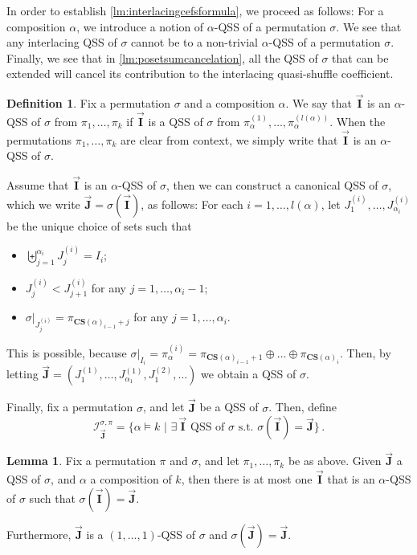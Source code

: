\documentclass[12pt, reqno]{amsart}
\theoremstyle{definition}
\newtheorem{lm}[thm]{Lemma}
\newtheorem{defin}[thm]{Definition}
\newcommand{\III}{\vec{\mathbf{I}}}
\newcommand{\JJJ}{\vec{\mathbf{J}}}
\begin{document}
In order to establish \cref{lm:interlacingcefsformula}, we proceed as follows:
For a composition $\alpha$, we introduce a notion of $\alpha$-QSS of a permutation $\sigma$.
We see that any interlacing QSS of $\sigma$ cannot be  to a non-trivial $\alpha$-QSS of a permutation $\sigma$.
Finally, we see that in \cref{lm:posetsumcancelation}, all the QSS of $\sigma$ that can be extended will cancel its contribution to the interlacing quasi-shuffle coefficient.

\begin{defin}
Fix a permutation $\sigma $ and a composition $\alpha $.
We say that $\III$ is an $\alpha$-QSS of $\sigma$ from $\pi_1, \dots ,\pi_k$ if $\III $ is a QSS of $\sigma $ from $\pi^{(1)}_{\alpha }, \dots ,\pi^{(l(\alpha ))}_{\alpha } $.
When the permutations $\pi_1, \dots ,\pi_k$ are clear from context, we simply write that $\III $ is an $\alpha$-QSS of $\sigma$.

Assume that $\III$ is an $\alpha$-QSS of $\sigma$, then we can construct a canonical QSS of $\sigma $, which we write  $\JJJ = \sigma(\III)$, as follows:
For each $i= 1 , \dots , l(\alpha )$, let $J^{(i)}_1, \dots , J^{(i)}_{\alpha_i} $ be the unique choice of sets such that 
\begin{itemize}
\item $\biguplus_{j=1}^{\alpha_i} J_j^{(i)} = I_i$;

\item $J_j^{(i)}< J_{j+1}^{(i)} $ for any $j=1 , \dots , \alpha_i-1 $;

\item $\sigma|_{J_j^{(i)}} = \pi_{\mathbf{CS}(\alpha)_{i-1} + j}$ for any $j=1 , \dots , \alpha_i $.
\end{itemize}

This is possible, because $\sigma|_{I_i} = \pi_{\alpha }^{(i)} = \pi_{\mathbf{CS}(\alpha )_{i-1}+1} \oplus \dots \oplus \pi_{\mathbf{CS}(\alpha )_{i}} $.
Then, by letting $\JJJ = (J^{(1)}_1, \dots , J^{(1)}_{\alpha_1},  J^{(2)}_1, \dots ) $ we obtain a QSS of $\sigma $.



Finally, fix a permutation $\sigma $, and let $\JJJ $ be a QSS of $\sigma $.
Then, define 
$$\mathcal I^{\sigma, \pi }_{\JJJ} = \{\alpha \models k \, \,  | \, \,  \exists \, \III \text{ QSS of } \sigma \text{ s.t. } \sigma(\III ) = \JJJ  \}\, . $$
\end{defin}



\begin{lm}
Fix a permutation $\pi$ and $\sigma $, and let $\pi_1, \dots ,\pi_k$ be as above.
Given $\JJJ$ a QSS of $\sigma$, and $\alpha$ a composition of $k$, then there is at most one $\III$ that is an $\alpha$-QSS of $\sigma$ such that $\sigma(\III ) = \JJJ$.

Furthermore, $\JJJ $ is a $(1, \dots , 1)$-QSS of $\sigma$ and $\sigma(\JJJ ) = \JJJ$.
\end{lm}
\end{document}
